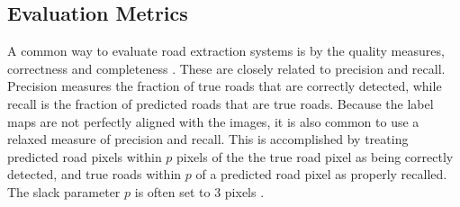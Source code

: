 \subsection{Evaluation Metrics}
A common way to evaluate road extraction systems is by the quality measures,  correctness and completeness \citep{Wiedemann_road_evaluation}. These are closely related to precision and recall. Precision measures the fraction of true roads that are correctly detected, while recall is the fraction of predicted roads that are true roads. Because the label maps are not perfectly aligned with the images, it is also common to use a relaxed measure of precision and recall. This is accomplished by treating predicted road pixels within $p$ pixels of the the true road pixel as being correctly detected, and true roads within $p$ of a predicted road pixel as properly recalled. The slack parameter $p$ is often set to 3 pixels \citep{Mnih_roads_high_res_aerial_images}.

